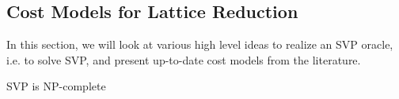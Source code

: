 




\subsection{Cost Models for Lattice Reduction} \label{sec:costmodels}
In this section, we will look at various high level ideas to realize an SVP oracle, i.e. to solve SVP, and present up-to-date cost models from the literature. 

SVP is NP-complete %


